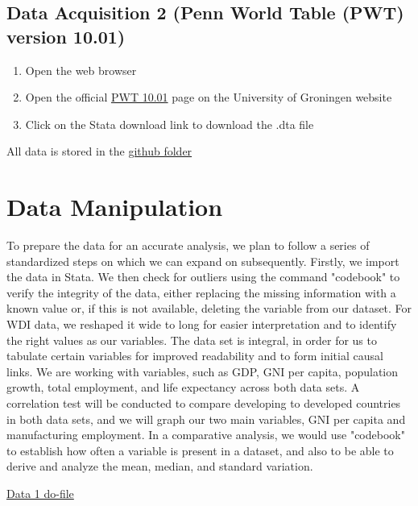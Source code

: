 \documentclass[12pt]{article}
\begin{document}
    \subsection{Data Acquisition 2 (Penn World Table (PWT) version 10.01)}
\begin{enumerate}
\item Open the web browser 

\item Open the official \href{https://www.rug.nl/ggdc/productivity/pwt/?lang=en}{PWT 10.01} page on the University of Groningen website

\item Click on the Stata download link to download the .dta file

\end{enumerate}
All data is stored in the \href{https://github.com/ecn310/course-project-development/issues/12}{github folder} 



\section{Data Manipulation}
\label{sec:data}

To prepare the data for an accurate analysis, we plan to follow a series of standardized steps on which we can expand on subsequently. Firstly, we import the data in Stata. We then check for outliers using the command "codebook" to verify the integrity of the data, either replacing the missing information with a known value or, if this is not available, deleting the variable from our dataset.  For WDI data, we reshaped it wide to long for easier interpretation and to identify the right values as our variables. 
The data set is integral, in order for us to tabulate certain variables for improved readability and to form initial causal links. We are working with variables, such as GDP, GNI per capita, population growth, total employment, and life expectancy across both data sets. A correlation test will be conducted to compare developing to developed countries in both data sets, and we will graph our two main variables, GNI per capita and manufacturing employment. In a comparative analysis, we would use "codebook" to establish how often a variable is present in a dataset, and also to be able to derive and analyze the mean, median, and standard variation.


\href{https://github.com/ecn310/course-project-development/blob/main/WDI.do}{Data 1 do-file} 
\end{document}
